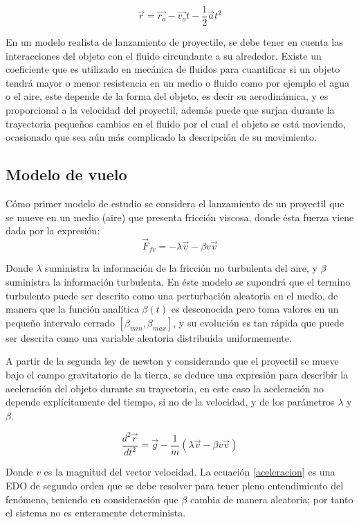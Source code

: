 \documentclass[11pt,letterpaper,twocolumn]{article}
\begin{document}
\begin{equation}
\vec{r}= \vec{r_{o}} -  \vec{v_{o}} t - \frac{1}{2} \vec{a} t^{2}
\end{equation}


\par
En un modelo realista de lanzamiento de proyectile, se debe tener en cuenta las interacciones del objeto con el fluido circundante a su alrededor. Existe un coeficiente que es utilizado en mecánica de fluidos para cuantificar si un  objeto tendrá mayor o menor resistencia en un medio o fluido como por ejemplo el agua o el aire, este depende de la forma del objeto, es decir su aerodinámica, y es proporcional a la velocidad del proyectil, además puede que surjan durante la trayectoria pequeños cambios en el fluido por el cual el objeto se está moviendo, ocasionado que sea aún más complicado la descripción de su movimiento.

\subsection*{Modelo de vuelo}
Cómo primer modelo de estudio se considera el lanzamiento de un proyectil que se mueve en un medio (aire) que presenta fricción viscosa, donde ésta fuerza viene dada por la expresión:\\
\begin{equation}
\vec{F}_{fv}= -\lambda \vec{v} - \beta v \vec{v}
\label{viscosa}
\end{equation}
\par 
Donde $\lambda$ suministra la información de la fricción no turbulenta del aire, y $\beta$ suministra la información turbulenta. En éste modelo se supondrá que el termino turbulento puede ser descrito como una perturbación aleatoria en el medio, de manera que la función analítica $\beta(t)$ es desconocida pero toma valores en un pequeño intervalo cerrado $[\beta_{min},\beta_{max}]$, y su evolución es tan rápida que puede ser descrita como una variable aleatoria distribuida uniformemente.\\
\par
A partir de la segunda ley de newton y considerando que el proyectil se mueve bajo el campo gravitatorio de la tierra, se deduce una expresión para describir la aceleración del objeto durante su trayectoria, en este caso la aceleración no depende explícitamente del tiempo, si no de la velocidad, y de los parámetros $\lambda$ y $\beta$.

\begin{equation}
\dfrac{d^{2}\vec{r}}{dt^{2}}=\vec{g}- \frac{1}{m}(\lambda \vec{v} - \beta v \vec{v})
\label{aceleracion}
\end{equation}
\par 
Donde $v$ es la magnitud del vector velocidad. La ecuación \ref{aceleracion} es una EDO de segundo orden que se debe resolver para tener pleno entendimiento del fenómeno, teniendo en consideración que $\beta$ cambia de manera aleatoria; por tanto el sistema no es enteramente determinista.   
\end{document}
